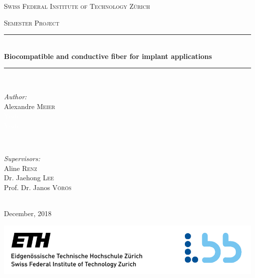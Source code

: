 \documentclass[12pt]{article}
\begin{document}
\begin{titlepage}

\newcommand{\HRule}{\rule{\linewidth}{0.5mm}} %

\center %
 
{\textsc{\LARGE Swiss Federal Institute of Technology Zürich  }\\[1cm]
}

\textsc{\Large Semester Project}\\[0.8cm] %


\HRule \\[0.4cm]
{  {\huge \bfseries Biocompatible and conductive fiber for implant applications}}\\[0.4cm] %

\HRule \\[1.5cm]
 


\begin{minipage}{0.4\textwidth}
\begin{flushleft} \large
\emph{Author:}\\
Alexandre \textsc{Meier}\\
\textcolor{white}{Yeah}\\
\textcolor{white}{Yeah}
\end{flushleft}
\end{minipage}
~
\begin{minipage}{0.5\textwidth}
\begin{flushright} \large
\emph{Supervisors:} \\
Aline \textsc{Renz}\\
Dr. Jaehong \textsc{Lee}\\
Prof. Dr. Janos \textsc{Vörös}
\end{flushright}
\end{minipage}\\[2cm]



{\large December, 2018}\\[2cm] 


\centerline{\includegraphics[scale=0.9]{./pic/ETH_LBB.PNG}}

\vfill 

\end{titlepage}
\
\end{document}
